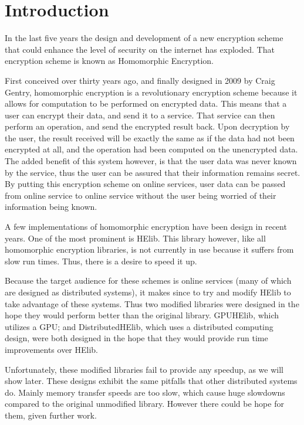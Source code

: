 \chapter{Introduction} \label{chap:Introduction}
In the last five years the design and development of a new encryption scheme that could enhance the level of security on the internet has exploded. That encryption scheme is known as Homomorphic Encryption. 

First conceived over thirty years ago, and finally designed in 2009 by Craig Gentry, homomorphic encryption is a revolutionary encryption scheme because it allows for computation to be performed on encrypted data. This means that a user can encrypt their data, and send it to a service. That service can then perform an operation, and send the encrypted result back. Upon decryption by the user, the result received will be exactly the same as if the data had not been encrypted at all, and the operation had been computed on the unencrypted data. The added benefit of this system however, is that the user data was never known by the service, thus the user can be assured that their information remains secret. By putting this encryption scheme on online services, user data can be passed from online service to online service without the user being worried of their information being known.

A few implementations of homomorphic encryption have been design in recent years. One of the most prominent is HElib. This library however, like all homomorphic encryption libraries, is not currently in use because it suffers from slow run times. Thus, there is a desire to speed it up. 

Because the target audience for these schemes is online services (many of which are designed as distributed systems), it makes since to try and modify HElib to take advantage of these systems. Thus two modified libraries were designed in the hope they would perform better than the original library. GPUHElib, which utilizes a GPU; and DistributedHElib, which uses a distributed computing design, were both designed in the hope that they would provide run time improvements over HElib. 

Unfortunately, these modified libraries fail to provide any speedup, as we will show later. These designs exhibit the same pitfalls that other distributed systems do. Mainly memory transfer speeds are too slow, which cause huge slowdowns compared to the original unmodified library. However there could be hope for them, given further work.